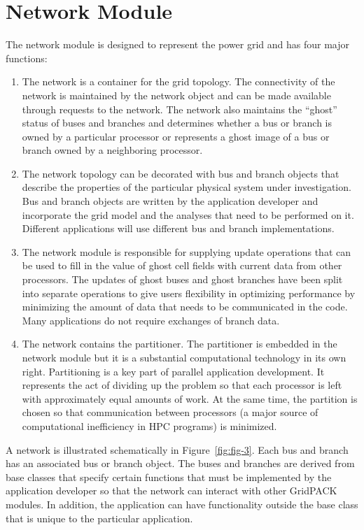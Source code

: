 \documentclass[12pt]{report} %
\begin{document}
\section{Network Module}

The network module is designed to represent the power grid and has four major functions:

\begin{enumerate}
\item  The network is a container for the grid topology. The connectivity of the network is maintained by the network object and can be made available through requests to the network. The network also maintains the ``ghost'' status of buses and branches and determines whether a bus or branch is owned by a particular processor or represents a ghost image of a bus or branch owned by a neighboring processor.

\item  The network topology can be decorated with bus and branch objects that describe the properties of the particular physical system under investigation. Bus and branch objects are written by the application developer and incorporate the grid model and the analyses that need to be performed on it. Different applications will use different bus and branch implementations.

\item  The network module is responsible for supplying update operations that can be used to fill in the value of ghost cell fields with current data from other processors. The updates of ghost buses and ghost branches have been split into separate operations to give users flexibility in optimizing performance by minimizing the amount of data that needs to be communicated in the code. Many applications do not require exchanges of branch data.

\item  The network contains the partitioner. The partitioner is embedded in the network module but it is a substantial computational technology in its own right. Partitioning is a key part of parallel application development. It represents the act of dividing up the problem so that each processor is left with approximately equal amounts of work. At the same time, the partition is chosen so that communication between processors (a major source of computational inefficiency in HPC programs) is minimized. 
\end{enumerate}

A network is illustrated schematically in Figure~\ref{fig:fig-3}. Each bus and branch has an associated bus or branch object. The buses and branches are derived from base classes that specify certain functions that must be implemented by the application developer so that the network can interact with other GridPACK modules. In addition, the application can have functionality outside the base class that is unique to the particular application.
\end{document}
